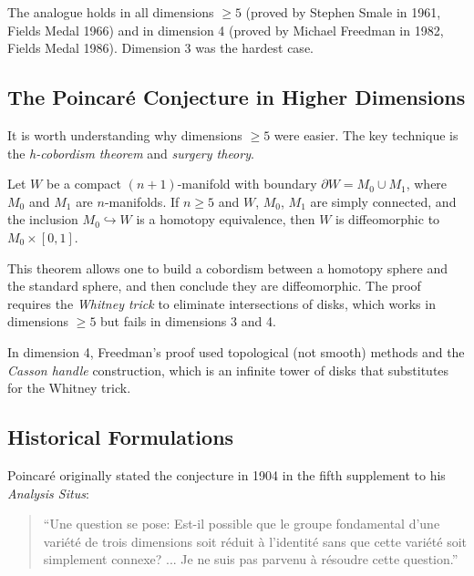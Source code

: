 \begin{remark}
The analogue holds in all dimensions $\ge 5$ (proved by Stephen Smale in 1961, Fields Medal 1966) and in dimension 4 (proved by Michael Freedman in 1982, Fields Medal 1986). Dimension 3 was the hardest case.
\end{remark}

\subsection{The Poincar\'{e} Conjecture in Higher Dimensions}

It is worth understanding why dimensions $\ge 5$ were easier. The key technique is the \textit{h-cobordism theorem} and \textit{surgery theory}.

\begin{theorem}
Let $W$ be a compact $(n+1)$-manifold with boundary $\partial W = M_0 \cup M_1$, where $M_0$ and $M_1$ are $n$-manifolds. If $n \ge 5$ and $W$, $M_0$, $M_1$ are simply connected, and the inclusion $M_0 \hookrightarrow W$ is a homotopy equivalence, then $W$ is diffeomorphic to $M_0 \times [0,1]$.
\end{theorem}

This theorem allows one to build a cobordism between a homotopy sphere and the standard sphere, and then conclude they are diffeomorphic. The proof requires the \textit{Whitney trick} to eliminate intersections of disks, which works in dimensions $\ge 5$ but fails in dimensions 3 and 4.

In dimension 4, Freedman's proof used topological (not smooth) methods and the \textit{Casson handle} construction, which is an infinite tower of disks that substitutes for the Whitney trick.

\subsection{Historical Formulations}

Poincar\'{e} originally stated the conjecture in 1904 in the fifth supplement to his \textit{Analysis Situs}:

\begin{quote}
``Une question se pose: Est-il possible que le groupe fondamental d'une vari\'{e}t\'{e} de trois dimensions soit r\'{e}duit \`{a} l'identit\'{e} sans que cette vari\'{e}t\'{e} soit simplement connexe? ... Je ne suis pas parvenu \`{a} r\'{e}soudre cette question.''
\end{quote}

